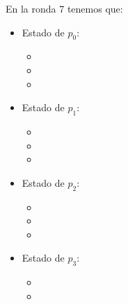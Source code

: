 En la ronda 7 tenemos que:

\begin{multicols}{2}
\begin{itemize}
\item Estado de $p_0$:
      \begin{itemize}
      \item {}
      
      \item {}
      
      \item {}
      \end{itemize}
      
\item Estado de $p_1$:
      \begin{itemize}
      \item {}
      
      \item {}
      
      \item {}
      \end{itemize}

\item Estado de $p_2$:
      \begin{itemize}
      \item {}
      
      \item {}
      
      \item {}
      \end{itemize}

\item Estado de $p_3$:
      \begin{itemize}
      \item {}
      
      \item {}
      

\end{itemize}
\end{itemize}
\end{multicols}
